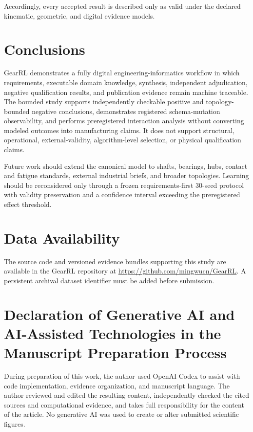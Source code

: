 \documentclass[preprint,12pt]{elsarticle}
\begin{document}
Accordingly, every accepted result is described only as valid under the declared kinematic, geometric, and digital evidence models.

\section{Conclusions}
GearRL demonstrates a fully digital engineering-informatics workflow in which requirements, executable domain knowledge, synthesis, independent adjudication, negative qualification results, and publication evidence remain machine traceable. The bounded study supports independently checkable positive and topology-bounded negative conclusions, demonstrates registered schema-mutation observability, and performs preregistered interaction analysis without converting modeled outcomes into manufacturing claims. It does not support structural, operational, external-validity, algorithm-level selection, or physical qualification claims.

Future work should extend the canonical model to shafts, bearings, hubs, contact and fatigue standards, external industrial briefs, and broader topologies. Learning should be reconsidered only through a frozen requirements-first 30-seed protocol with validity preservation and a confidence interval exceeding the preregistered effect threshold.

\section{Data Availability}
The source code and versioned evidence bundles supporting this study are available in the GearRL repository at \url{https://github.com/mingwucn/GearRL}. A persistent archival dataset identifier must be added before submission.

\section{Declaration of Generative AI and AI-Assisted Technologies in the Manuscript Preparation Process}
During preparation of this work, the author used OpenAI Codex to assist with code implementation, evidence organization, and manuscript language. The author reviewed and edited the resulting content, independently checked the cited sources and computational evidence, and takes full responsibility for the content of the article. No generative AI was used to create or alter submitted scientific figures.
\end{document}
